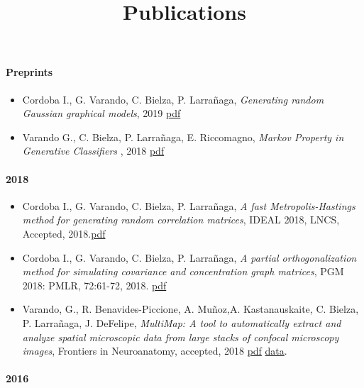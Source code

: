 \documentclass[]{article}
\title{Publications}
\date{}
\providecommand{\tightlist}{%
  \setlength{\itemsep}{0pt}\setlength{\parskip}{0pt}}
\let\oldparagraph\paragraph
\renewcommand{\paragraph}[1]{\oldparagraph{#1}\mbox{}}
\begin{document}
\maketitle

\hypertarget{preprints}{%
\paragraph{Preprints}\label{preprints}}

\begin{itemize}
\tightlist
\item
  Cordoba I., G. Varando, C. Bielza, P. Larrañaga, \emph{Generating
  random Gaussian graphical models}, 2019
  \href{https://arxiv.org/pdf/1909.01062.pdf}{pdf}
\item
  Varando G., C. Bielza, P. Larrañaga, E. Riccomagno, \emph{Markov
  Property in Generative Classifiers} , 2018
  \href{https://arxiv.org/pdf/1811.04759.pdf}{pdf}
\end{itemize}

\hypertarget{section}{%
\paragraph{2018}\label{section}}

\begin{itemize}
\tightlist
\item
  Cordoba I., G. Varando, C. Bielza, P. Larrañaga, \emph{A fast
  Metropolis-Hastings method for generating random correlation
  matrices}, IDEAL 2018, LNCS, Accepted,
  2018.\href{https://arxiv.org/pdf/1809.00351.pdf}{pdf}
\item
  Cordoba I., G. Varando, C. Bielza, P. Larrañaga, \emph{A partial
  orthogonalization method for simulating covariance and concentration
  graph matrices}, PGM 2018: PMLR, 72:61-72, 2018.
  \href{http://proceedings.mlr.press/v72/cordoba18a.pdf}{pdf}
\item
  Varando, G., R. Benavides-Piccione, A. Muñoz,A. Kastanauskaite, C.
  Bielza, P. Larrañaga, J. DeFelipe, \emph{MultiMap: A tool to
  automatically extract and analyze spatial microscopic data from large
  stacks of confocal microscopy images}, Frontiers in Neuroanatomy,
  accepted, 2018
  \href{https://www.frontiersin.org/articles/10.3389/fnana.2018.00037/pdf}{pdf}
  \textbar{} \href{https://data.broadinstitute.org/bbbc/BBBC044/}{data}.
\end{itemize}

\hypertarget{section-1}{%
\paragraph{2016}\label{section-1}}
\end{document}
